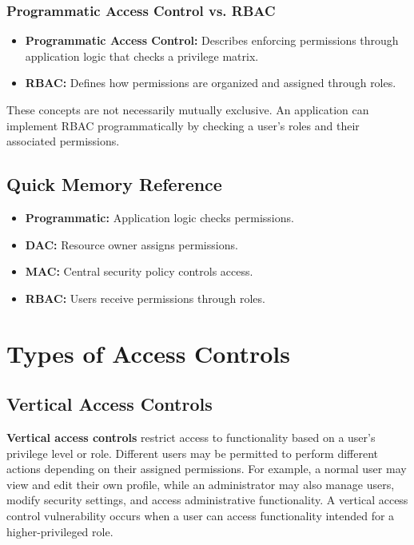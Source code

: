 \documentclass[11pt,a4paper]{article}
\begin{document}
\subsubsection{Programmatic Access Control vs. RBAC}

\begin{itemize}
    \item \textbf{Programmatic Access Control:} Describes enforcing permissions through application logic that checks a privilege matrix.
    \item \textbf{RBAC:} Defines how permissions are organized and assigned through roles.
\end{itemize}

These concepts are not necessarily mutually exclusive. An application can implement RBAC programmatically by checking a user's roles and their associated permissions.

\subsection{Quick Memory Reference}

\begin{itemize}
    \item \textbf{Programmatic:} Application logic checks permissions.
    \item \textbf{DAC:} Resource owner assigns permissions.
    \item \textbf{MAC:} Central security policy controls access.
    \item \textbf{RBAC:} Users receive permissions through roles.
\end{itemize}

\newpage
\section{Types of Access Controls}

\subsection{Vertical Access Controls}

\textbf{Vertical access controls} restrict access to functionality based on a user's privilege level or role. Different users may be permitted to perform different actions depending on their assigned permissions.
For example, a normal user may view and edit their own profile, while an administrator may also manage users, modify security settings, and access administrative functionality.
A vertical access control vulnerability occurs when a user can access functionality intended for a higher-privileged role.
\end{document}
